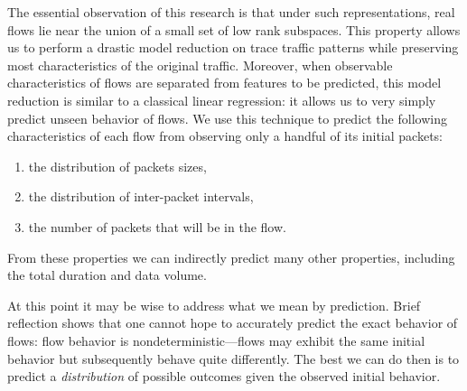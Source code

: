 \documentclass[conference]{IEEEtran}
\begin{document}
The essential observation of this research is that under such representations, real flows lie near the union of a small set of low rank subspaces.
This property allows us to perform a drastic model reduction on trace traffic patterns while preserving most characteristics of the original traffic.
Moreover, when observable characteristics of flows are separated from features to be predicted, this model reduction is similar to a classical linear regression:
it allows us to very simply predict unseen behavior of flows.
We use this technique to predict the following characteristics of each flow from observing only a handful of its initial packets:
\begin{enumerate}
  \item the distribution of packets sizes,
  \item the distribution of inter-packet intervals,
  \item the number of packets that will be in the flow.
\end{enumerate}
From these properties we can indirectly predict many other properties, including the total duration and data volume.

At this point it may be wise to address what we mean by prediction.
Brief reflection shows that one cannot hope to accurately predict the exact behavior of flows:
flow behavior is nondeterministic---flows may exhibit the same initial behavior but subsequently behave quite differently.
The best we can do then is to predict a \emph{distribution} of possible outcomes given the observed initial behavior.






\end{document}
